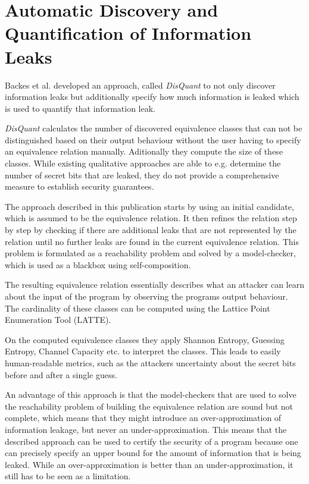 \documentclass[a4paper,UKenglish]{lipics-v2018}
\begin{document}


\section{Automatic Discovery and Quantification of Information Leaks}

Backes et al. developed an approach, called \textit{DisQuant} to not only discover information leaks but additionally specify how much information is leaked which is used to quantify that information leak.\cite{automatic_discovery_and_quantification}

\textit{DisQuant} calculates the number of discovered equivalence classes that can not be distinguished based on their output behaviour without the user having to specify an equivalence relation manually. Aditionally they compute the size of these classes. While existing qualitative approaches are able to e.g. determine the number of secret bits that are leaked, they do not provide a comprehensive measure to establish security guarantees.\cite{automatic_discovery_and_quantification}

The approach described in this publication starts by using an initial candidate, which is assumed to be the equivalence relation. It then refines the relation step by step by checking if there are additional leaks that are not represented by the relation until no further leaks are found in the current equivalence relation. This problem is formulated as a reachability problem and solved by a model-checker, which is used as a blackbox using self-composition.\cite{automatic_discovery_and_quantification}

The resulting equivalence relation essentially describes what an attacker can learn about the input of the program by observing the programs output behaviour. The cardinality of these classes can be computed using the Lattice Point Enumeration Tool (LATTE).\cite{automatic_discovery_and_quantification}

On the computed equivalence classes they apply Shannon Entropy, Guessing Entropy, Channel Capacity etc. to interpret the classes. This leads to easily human-readable metrics, such as the attackers uncertainty about the secret bits before and after a single guess.\cite{automatic_discovery_and_quantification}

An advantage of this approach is that the model-checkers that are used to solve the reachability problem of building the equivalence relation are sound but not complete, which means that they might introduce an over-approximation of information leakage, but never an under-approximation. This means that the described approach can be used to certify the security of a program because one can precisely specify an upper bound for the amount of information that is being leaked.\cite{automatic_discovery_and_quantification} While an over-approximation is better than an under-approximation, it still has to be seen as a limitation.
\end{document}
